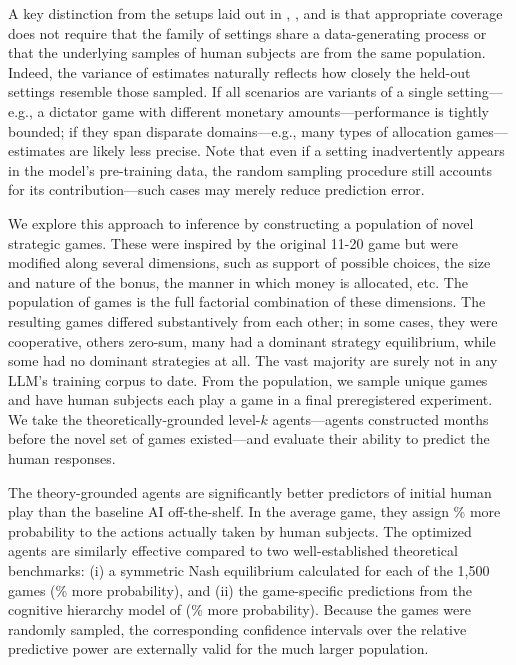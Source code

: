 A key distinction from the setups laid out in \citeauthor{Hotz2005PredictingEfficacy}, \citeauthor{Allcott2015Site}, and \citeauthor{Dehejia2019External} is that appropriate coverage does not require that the family of settings share a data-generating process or that the underlying samples of human subjects are from the same population.
Indeed, the variance of estimates naturally reflects how closely the held-out settings resemble those sampled.  
If all scenarios are variants of a single setting---e.g., a dictator game with different monetary amounts---performance is tightly bounded; if they span disparate domains---e.g., many types of allocation games---estimates are likely less precise.
Note that even if a setting inadvertently appears in the model's pre-training data, the random sampling procedure still accounts for its contribution---such cases may merely reduce prediction error.

We explore this approach to inference by constructing a population of \TotalGames{} novel strategic games.
These were inspired by the original 11-20 game but were modified along several dimensions, such as support of possible choices, the size and nature of the bonus, the manner in which money is allocated, etc. 
The population of games is the full factorial combination of these dimensions.
The resulting games differed substantively from each other; in some cases, they were cooperative, others zero-sum, many had a dominant strategy equilibrium, while some had no dominant strategies at all.
The vast majority are surely not in any LLM's training corpus to date.
From the population, we sample \NGamesS{} unique games and have \NParticipantS{} human subjects each play a game in a final preregistered experiment.
We take the theoretically-grounded level-$k$ agents---agents constructed months before the novel set of \TotalGames{} games existed---and evaluate their ability to predict the human responses.

The theory-grounded agents are significantly better predictors of initial human play than the baseline AI off-the-shelf.
In the average game, they assign \PctBaselineBarLambda\% more probability to the actions actually taken by human subjects.
The optimized agents are similarly effective compared to two well-established theoretical benchmarks: (i) a symmetric Nash equilibrium calculated for each of the 1,500 games (\PctNashBarLambda\% more probability), and (ii) the game-specific predictions from the cognitive hierarchy model of \cite{Camerer2004Cognitive} (\PctCHBarLambda\% more probability).
Because the games were randomly sampled, the corresponding confidence intervals over the relative predictive power are externally valid for the much larger population.

